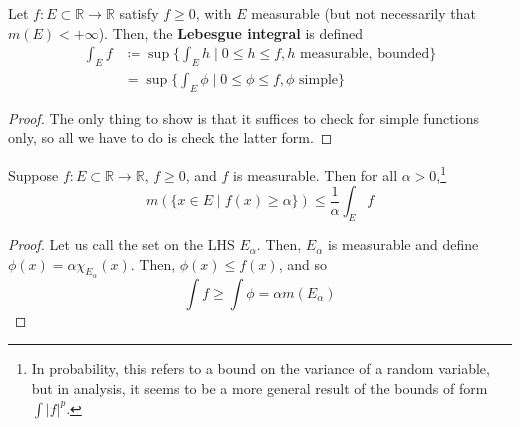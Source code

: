   \begin{definition}
    Let $f: E \subset \mathbb{R} \to \mathbb{R}$ satisfy $f \geq 0$, with $E$ measurable (but not necessarily that $m(E) < +\infty$). Then, the \textbf{Lebesgue integral} is defined 
    \begin{align}
      \int_E f & \coloneqq \sup \bigg\{ \int_E h \; \bigg| \; 0 \leq h \leq f, h \text{ measurable, bounded} \bigg\} \\ 
               & = \sup \bigg\{ \int_E \phi \; \bigg| \; 0 \leq \phi \leq f, \phi \text{ simple} \bigg\}
    \end{align}
  \end{definition}
  \begin{proof}
    The only thing to show is that it suffices to check for simple functions only, so all we have to do is check the latter form. 
  \end{proof} 

  \begin{lemma}[Chebyshev]
    Suppose $f: E \subset \mathbb{R} \to \mathbb{R}$, $f \geq 0$, and $f$ is measurable. Then for all $\alpha > 0$,\footnote{In probability, this refers to a bound on the variance of a random variable, but in analysis, it seems to be a more general result of the bounds of form $\int |f|^p$.} 
    \begin{equation}
      m( \{ x \in E \mid f(x) \geq \alpha\}) \leq \frac{1}{\alpha} \int_E f 
    \end{equation}
  \end{lemma}
  \begin{proof}
    Let us call the set on the LHS $E_\alpha$. Then, $E_\alpha$ is measurable and define $\phi(x) = \alpha \chi_{E_\alpha} (x)$. Then, $\phi(x) \leq f(x)$, and so 
    \begin{equation}
      \int f \geq \int \phi = \alpha m(E_\alpha)
    \end{equation}
  \end{proof}

